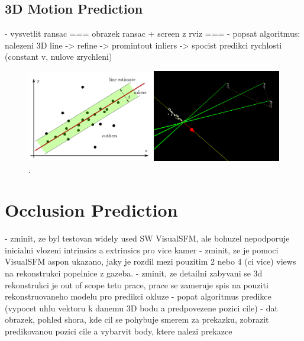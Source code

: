 \subsection{3D Motion Prediction}


- vysvetlit ransac
=== obrazek ransac + screen z rviz ===
- popsat algoritmus: nalezeni 3D line -> refine -> promintout inliers -> spocist predikci rychlosti (constant v, nulove zrychleni)

\begin{figure}[htb]
	\centering
	\includegraphics[width=0.8\linewidth]{fig/ransac_theory_rviz.png}
	\caption{.}
	\label{fig:ransac}
\end{figure}



\section{Occlusion Prediction} \label{txt:occlusion_prediction}
- zminit, ze byl testovan widely used SW VisualSFM, ale bohuzel nepodporuje inicialni vlozeni intrinsics a extrinsics pro vice kamer
- zminit, ze je pomoci VisualSFM aspon ukazano, jaky je rozdil mezi pouzitim 2 nebo 4 (ci vice) views na rekonstrukci popelnice z gazeba.
- zminit, ze detailni zabyvani se 3d rekonstrukci je out of scope teto prace, prace se zameruje spis na pouziti rekonstruovaneho modelu pro predikci okluze
- popat algoritmus predikce (vypocet uhlu vektoru k danemu 3D bodu a predpovezene pozici cile)
- dat obrazek, pohled shora, kde cil se pohybuje smerem za prekazku, zobrazit predikovanou pozici cile a vybarvit body, ktere nalezi prekazce

